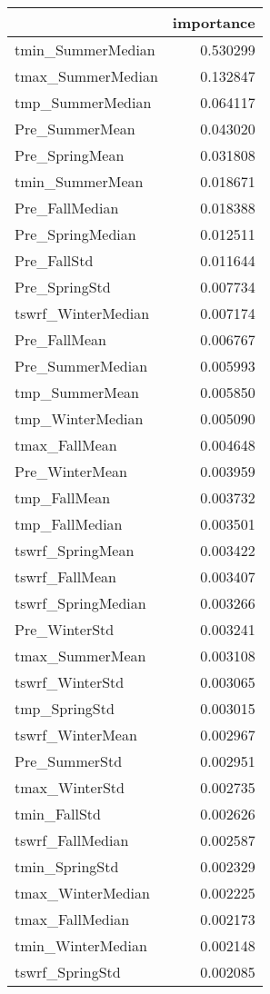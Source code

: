 \begin{tabular}{lr}
\toprule
 & importance \\
\midrule
tmin_SummerMedian & 0.530299 \\
tmax_SummerMedian & 0.132847 \\
tmp_SummerMedian & 0.064117 \\
Pre_SummerMean & 0.043020 \\
Pre_SpringMean & 0.031808 \\
tmin_SummerMean & 0.018671 \\
Pre_FallMedian & 0.018388 \\
Pre_SpringMedian & 0.012511 \\
Pre_FallStd & 0.011644 \\
Pre_SpringStd & 0.007734 \\
tswrf_WinterMedian & 0.007174 \\
Pre_FallMean & 0.006767 \\
Pre_SummerMedian & 0.005993 \\
tmp_SummerMean & 0.005850 \\
tmp_WinterMedian & 0.005090 \\
tmax_FallMean & 0.004648 \\
Pre_WinterMean & 0.003959 \\
tmp_FallMean & 0.003732 \\
tmp_FallMedian & 0.003501 \\
tswrf_SpringMean & 0.003422 \\
tswrf_FallMean & 0.003407 \\
tswrf_SpringMedian & 0.003266 \\
Pre_WinterStd & 0.003241 \\
tmax_SummerMean & 0.003108 \\
tswrf_WinterStd & 0.003065 \\
tmp_SpringStd & 0.003015 \\
tswrf_WinterMean & 0.002967 \\
Pre_SummerStd & 0.002951 \\
tmax_WinterStd & 0.002735 \\
tmin_FallStd & 0.002626 \\
tswrf_FallMedian & 0.002587 \\
tmin_SpringStd & 0.002329 \\
tmax_WinterMedian & 0.002225 \\
tmax_FallMedian & 0.002173 \\
tmin_WinterMedian & 0.002148 \\
tswrf_SpringStd & 0.002085 \\

\end{tabular}
